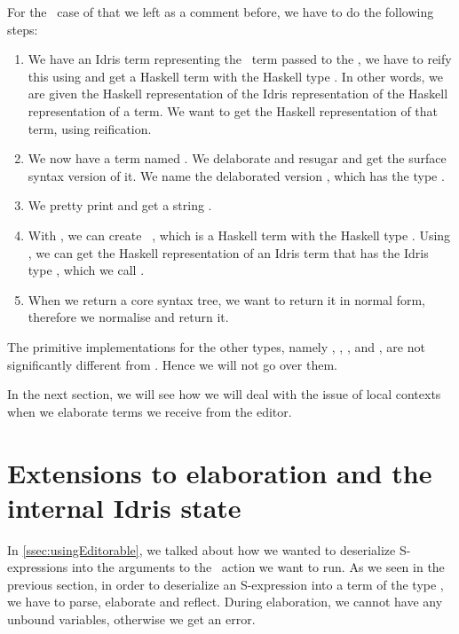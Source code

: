 For the \TT\ case of  that we left as a comment before, we have to do the following steps:
\begin{enumerate}
  \item We have an Idris term  representing the \TT\ term passed to
    the , we have to reify this using  and
    get a Haskell term with the Haskell type .
    In other words, we are given the Haskell representation of the Idris
    representation of the Haskell representation of a term.
    We want to get the Haskell representation of that term, using reification.
  \item We now have a  term named . We delaborate and resugar
     and get the surface syntax version of it. We name the delaborated
    version , which has the type .
  \item We pretty print  and get a string .
  \item With , we can create \texttt{ }, which is a
    Haskell term with the Haskell type . Using , we
    can get the Haskell representation of an Idris term that has the Idris type
    , which we call .
  \item When we return a core syntax tree, we want to return it in normal form,
    therefore we normalise  and return it.
\end{enumerate}

The primitive implementations for the other types, namely ,
, , and , are not significantly
different from . Hence we will not go over them.

In the next section, we will see how we will deal with the issue of local
contexts when we elaborate terms we receive from the editor.

\section{Extensions to elaboration and the internal Idris state}
\label{sec:extendIState}

In \autoref{ssec:usingEditorable}, we talked about how we wanted to deserialize
S-expressions into the arguments to the \Elab\ action we want to run.
As we seen in the previous section, in order to deserialize an S-expression
into a term of the type \TT, we have to parse, elaborate and reflect.
During elaboration, we cannot have any unbound variables, otherwise we get an
error.

